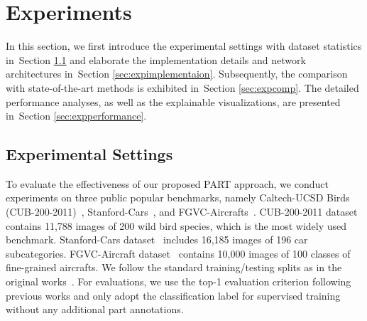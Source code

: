 \documentclass[journal]{IEEEtran}
\newcommand{\secref}[1]{Section \ref{#1}}
\begin{document}
\section{Experiments}\label{sec:experiment}
In this section, we first introduce the experimental settings with dataset statistics in~\secref{sec:expsettings} and elaborate the implementation details and network architectures in~\secref{sec:expimplementaion}. Subsequently, the comparison with state-of-the-art methods is exhibited in~\secref{sec:expcomp}. The detailed performance analyses, as well as the explainable visualizations, are presented in~\secref{sec:expperformance}.

\subsection{Experimental Settings}\label{sec:expsettings}
To evaluate the effectiveness of our proposed PART approach, we conduct experiments on three public popular benchmarks, namely Caltech-UCSD Birds (CUB-200-2011)~\cite{wah2011caltech}, Stanford-Cars~\cite{krause20133d}, and FGVC-Aircrafts~\cite{maji2013fine}. CUB-200-2011 dataset~\cite{wah2011caltech} contains 11,788 images of 200 wild bird species, which is the most widely used benchmark. Stanford-Cars dataset~\cite{krause20133d} includes 16,185 images of 196 car subcategories. FGVC-Aircraft dataset~\cite{maji2013fine} contains 10,000 images of 100 classes of fine-grained aircrafts.
We follow the standard training/testing splits as in the original works~\cite{wah2011caltech,krause20133d,maji2013fine}. For evaluations, we use the top-1 evaluation criterion following previous works and only adopt the classification label for supervised training without any additional part annotations.
\end{document}
